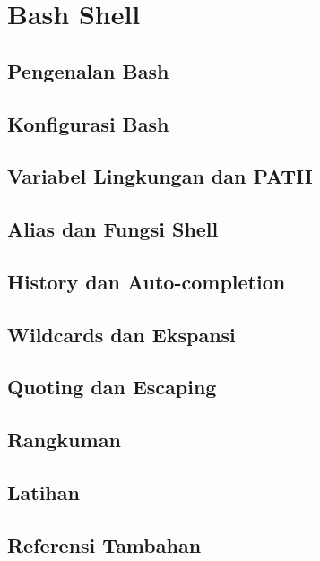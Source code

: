 
\chapter{Bash Shell}
\label{ch:bash-shell}

\begin{abstract}
Bab ini membahas Bash sebagai shell default di Linux, konfigurasi Bash,
variabel lingkungan, alias, dan fitur-fitur Bash lainnya.
\end{abstract}

\section{Pengenalan Bash}
\section{Konfigurasi Bash}
\section{Variabel Lingkungan dan PATH}
\section{Alias dan Fungsi Shell}
\section{History dan Auto-completion}
\section{Wildcards dan Ekspansi}
\section{Quoting dan Escaping}
\section{Rangkuman}
\section{Latihan}
\section{Referensi Tambahan}
